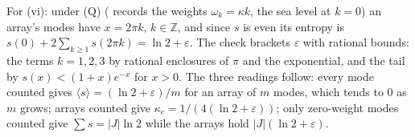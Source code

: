 For (vi): under (Q) ( records the weights $\omega_{k} = \kappa k$, the sea level at $k = 0$) an array's modes have $x = 2\pi k$, $k \in \mathbb{Z}$, and since $s$ is even its entropy is $s(0) + 2\sum_{k \ge 1} s(2\pi k) = \ln 2 + \varepsilon$. The check brackets $\varepsilon$ with rational bounds: the terms $k = 1, 2, 3$ by rational enclosures of $\pi$ and the exponential, and the tail by $s(x) < (1 + x)e^{-x}$ for $x > 0$. The three readings follow: every mode counted gives $\langle s\rangle = (\ln 2 + \varepsilon)/m$ for an array of $m$ modes, which tends to $0$ as $m$ grows; arrays counted give $\kappa_{c} = 1/(4(\ln 2 + \varepsilon))$; only zero-weight modes counted give $\sum s = |J|\ln 2$ while the arrays hold $|J|(\ln 2 + \varepsilon)$.
